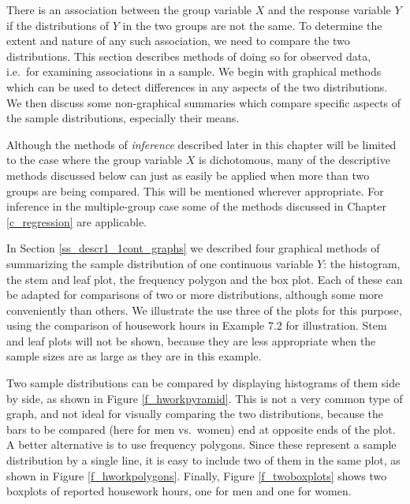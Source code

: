 There is an association between the group variable $X$ and the
response variable $Y$ if the distributions of $Y$ in the two
groups are not the same. To determine the extent and nature of any such
association, we need to compare the two distributions. This section
describes methods of doing so for observed data, i.e.\ for examining
associations in a sample. We begin with graphical methods which can be
used to detect differences in any aspects of the two distributions. We
then discuss some non-graphical summaries which compare specific aspects
of the sample distributions, especially their means.

Although the methods of \emph{inference} described later in this chapter
will be limited to the case where the group variable $X$ is dichotomous,
many of the descriptive methods discussed below can just as easily be
applied when more than two groups are being compared. This will be
mentioned wherever appropriate. For inference in the multiple-group case
some of the methods discussed in Chapter \ref{c_regression} are
applicable.

In Section \ref{ss_descr1_1cont_graphs} we described four graphical
methods of summarizing the sample distribution of one continuous
variable $Y$: the histogram, the stem and leaf plot, the frequency
polygon and the box plot. Each of these can be adapted for
comparisons of two  or more distributions, although some more
conveniently than others. We illustrate the use three of the
plots for this purpose, using the comparison of housework hours in
Example 7.2 for illustration. Stem and leaf plots will not be shown,
because they are less appropriate when the sample sizes are as large as
they are in this example.

Two sample distributions can be compared by displaying histograms of
them side by side, as shown in Figure \ref{f_hworkpyramid}. This is not
a very common type of graph,
and not ideal for visually
comparing the two distributions, because the bars to be compared (here
for men vs.\ women) end at opposite ends of
the plot. A better alternative is to use frequency polygons. Since these
represent a sample distribution by a single line, it is easy to include
two of them in the same plot, as shown in Figure \ref{f_hworkpolygons}.
Finally, Figure \ref{f_twoboxplots} shows two boxplots of reported
housework hours, one for men and one for women.

